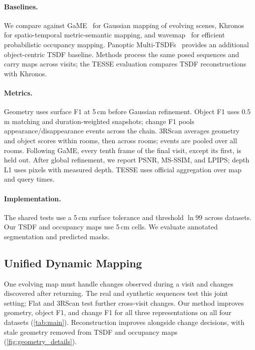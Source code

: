 \paragraph{Baselines.}
We compare against GaME~\cite{yugay2026game} for Gaussian mapping of evolving scenes,
Khronos~\cite{schmid2024khronos} for spatio-temporal metric-semantic mapping, and
wavemap~\cite{reijgwart2023wavemap} for efficient probabilistic occupancy mapping.
Panoptic Multi-TSDFs~\cite{schmid2022panoptic} provides an additional object-centric TSDF baseline.
Methods process the same posed sequences and carry maps across visits; the TESSE evaluation compares TSDF
reconstructions with Khronos.

\paragraph{Metrics.}
Geometry uses surface F1 at 5\,cm before Gaussian refinement. Object F1 uses 0.5\,m matching and
duration-weighted snapshots; change F1 pools appearance/disappearance events across the chain.
3RScan averages geometry and object scores within rooms, then across rooms; events are pooled over all rooms.
Following GaME, every tenth frame of the final visit, except its first, is held out. After global refinement,
we report PSNR, MS-SSIM, and LPIPS; depth L1 uses pixels with measured depth. TESSE uses official aggregation
over map and query times.

\paragraph{Implementation.}
The shared tests use a 5\,cm surface tolerance and threshold $\ln 99$ across datasets.
Our TSDF and occupancy maps use 5\,cm cells. We evaluate annotated segmentation and predicted masks.

\subsection{Unified Dynamic Mapping}
\label{sec:exp_main}

One evolving map must handle changes observed during a visit and changes discovered after returning.
The real and synthetic sequences test this joint setting; Flat and 3RScan test further cross-visit changes.
Our method improves geometry, object F1, and change F1 for all three representations on all four datasets
(\cref{tab:main}). Reconstruction improves alongside change decisions, with stale geometry removed from
TSDF and occupancy maps (\cref{fig:geometry_details}).

